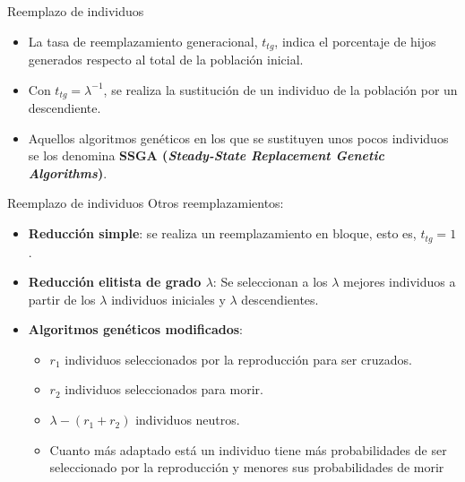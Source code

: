 \documentclass[10pt]{beamer}
\begin{document}
\begin{frame}{Reemplazo de individuos}
	\begin{itemize}
		\item La tasa de reemplazamiento generacional, $t_{tg}$, indica el porcentaje de hijos generados respecto al total de la población inicial.
		\item Con $t_{tg} = \lambda^{-1}$, se realiza la sustitución de un individuo de la población por un descendiente.
		\item Aquellos algoritmos genéticos en los que se sustituyen unos pocos individuos se los denomina \textbf{SSGA (\textit{Steady-State Replacement Genetic Algorithms})}.
	\end{itemize}
\end{frame}

\begin{frame}{Reemplazo de individuos}
	Otros reemplazamientos:
	\begin{itemize}
		\item \textbf{Reducción simple}: se realiza un reemplazamiento en bloque, esto es, $t_{tg} = 1$.
		\item \textbf{Reducción elitista de grado $\lambda$}: Se seleccionan a los $\lambda$ mejores individuos a partir de los $\lambda$ individuos iniciales y $\lambda$ descendientes.
		\item \textbf{Algoritmos genéticos modificados}: 
		\begin{itemize}
			\item $r_{1}$ individuos seleccionados por la reproducción para ser cruzados. 			
			\item $r_{2}$ individuos seleccionados para morir.
			\item $\lambda - (r_{1} + r_{2})$ individuos neutros.
			\item Cuanto más adaptado está un individuo tiene más probabilidades de ser seleccionado por la reproducción y menores sus probabilidades de morir
		\end{itemize}
	\end{itemize}
\end{frame}
\end{document}
